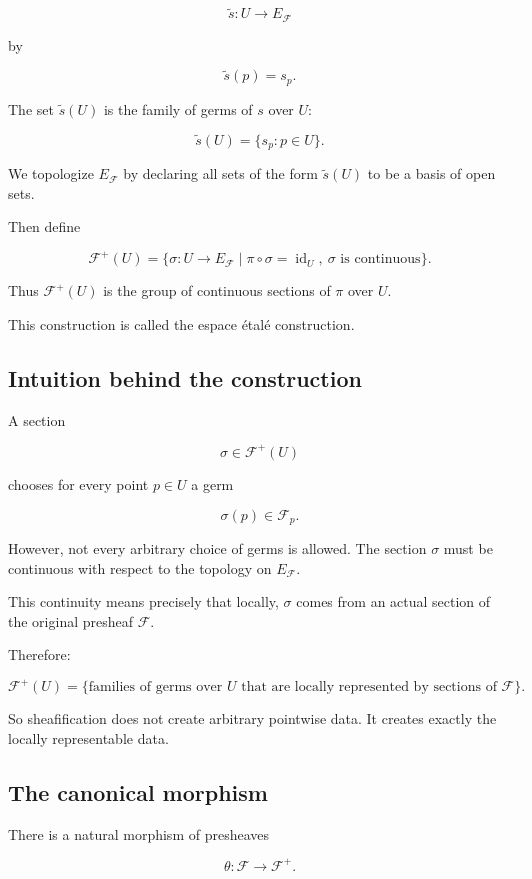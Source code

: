 \documentclass[12pt,a4paper]{article}
\newcommand{\id}{\operatorname{id}}
\begin{document}
\[
\widetilde{s} : U \longrightarrow E_{\mathcal F}
\]

by

\[
\widetilde{s}(p)=s_p.
\]

The set $\widetilde{s}(U)$ is the family of germs of $s$ over $U$:

\[
\widetilde{s}(U)
=
\{s_p : p \in U\}.
\]

We topologize $E_{\mathcal F}$ by declaring all sets of the form
$\widetilde{s}(U)$ to be a basis of open sets.

Then define

\[
\mathcal F^+(U)
=
\{\sigma : U \to E_{\mathcal F}
\mid
\pi \circ \sigma = \id_U,
\ \sigma \text{ is continuous}\}.
\]

Thus $\mathcal F^+(U)$ is the group of continuous sections of $\pi$ over $U$.

This construction is called the espace \'{e}tal\'{e} construction.

\subsection{Intuition behind the construction}

A section

\[
\sigma \in \mathcal F^+(U)
\]

chooses for every point $p \in U$ a germ

\[
\sigma(p) \in \mathcal F_p.
\]

However, not every arbitrary choice of germs is allowed.
The section $\sigma$ must be continuous with respect to the topology on
$E_{\mathcal F}$.

This continuity means precisely that locally, $\sigma$ comes from an actual
section of the original presheaf $\mathcal F$.

Therefore:

\[
\boxed{
	\mathcal F^+(U)
	=
	\{
	\text{families of germs over } U
	\text{ that are locally represented by sections of } \mathcal F
	\}.
}
\]

So sheafification does not create arbitrary pointwise data.
It creates exactly the locally representable data.

\subsection{The canonical morphism}

There is a natural morphism of presheaves

\[
\theta : \mathcal F \longrightarrow \mathcal F^+.
\]
\end{document}

